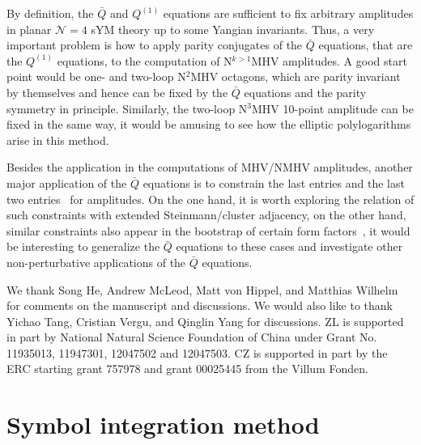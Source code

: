 \documentclass[a4paper,12pt]{article}
\begin{document}
By definition, the $\bar{Q}$ and $Q^{(1)}$ equations are sufficient to fix arbitrary amplitudes in planar $\mathcal{N}=4$ sYM theory up to some Yangian invariants. Thus, a very important problem is how to apply parity conjugates of the $\bar{Q}$ equations, that are the $Q^{(1)}$ equations, to the computation of N$^{k>1}$MHV amplitudes. A good start point would be one- and two-loop N$^{2}$MHV octagons, which are parity invariant by themselves and hence can be fixed by the $\bar{Q}$ equations and the parity symmetry in principle. Similarly, the two-loop N$^{3}$MHV 10-point amplitude can be fixed in the same way, it would be amusing to see how the elliptic polylogarithms arise in this method.

Besides the application in the computations of MHV/NMHV amplitudes, another major application of the $\bar{Q}$ equations is to constrain the last entries and the last two entries~\cite{He:2021mme} for amplitudes. On the one hand, it is worth exploring the relation of such constraints with extended Steinmann/cluster adjacency, on the other hand, similar constraints also appear in the bootstrap of certain form factors~\cite{Brandhuber:2012vm,Dixon:2020bbt}, it would be interesting to generalize the $\bar{Q}$ equations to these cases and investigate other non-perturbative applications of the $\bar{Q}$ equations.





\begin{acknowledgments}
We thank Song He, Andrew McLeod, Matt von Hippel, and Matthias Wilhelm for comments on the manuscript and discussions. 
We would also like to thank Yichao Tang, Cristian Vergu, and Qinglin Yang for discussions. 
ZL is supported in part by National Natural Science Foundation of China under Grant No. 11935013, 11947301, 12047502 and 12047503. 
CZ is supported in part by the ERC starting grant 757978 and grant 00025445 from the Villum Fonden.
\end{acknowledgments}

\appendix

\section{Symbol integration method} \label{appa}
\end{document}
